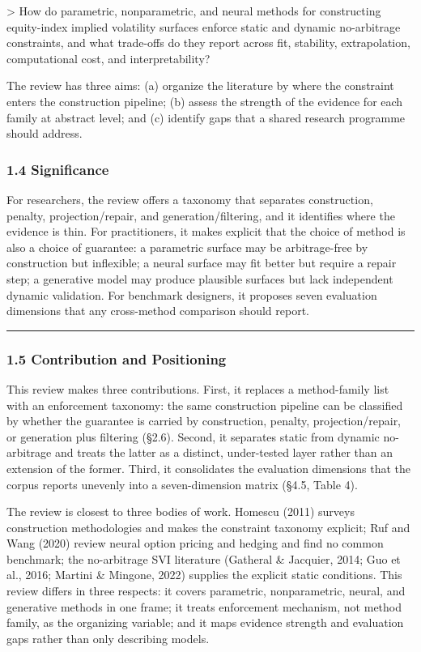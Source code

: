 \documentclass[11pt]{article}
\begin{document}
> How do parametric, nonparametric, and neural methods for constructing equity-index implied volatility surfaces enforce static and dynamic no-arbitrage constraints, and what trade-offs do they report across fit, stability, extrapolation, computational cost, and interpretability?

The review has three aims: (a) organize the literature by where the constraint enters the construction pipeline; (b) assess the strength of the evidence for each family at abstract level; and (c) identify gaps that a shared research programme should address.

\subsubsection*{1.4 Significance}
For researchers, the review offers a taxonomy that separates construction, penalty, projection/repair, and generation/filtering, and it identifies where the evidence is thin. For practitioners, it makes explicit that the choice of method is also a choice of guarantee: a parametric surface may be arbitrage-free by construction but inflexible; a neural surface may fit better but require a repair step; a generative model may produce plausible surfaces but lack independent dynamic validation. For benchmark designers, it proposes seven evaluation dimensions that any cross-method comparison should report.

\par\medskip\hrule\medskip
\subsubsection*{1.5 Contribution and Positioning}
This review makes three contributions. First, it replaces a method-family list with an enforcement taxonomy: the same construction pipeline can be classified by whether the guarantee is carried by construction, penalty, projection/repair, or generation plus filtering (\S 2.6). Second, it separates static from dynamic no-arbitrage and treats the latter as a distinct, under-tested layer rather than an extension of the former. Third, it consolidates the evaluation dimensions that the corpus reports unevenly into a seven-dimension matrix (\S 4.5, Table 4).

The review is closest to three bodies of work. Homescu (2011) surveys construction methodologies and makes the constraint taxonomy explicit; Ruf and Wang (2020) review neural option pricing and hedging and find no common benchmark; the no-arbitrage SVI literature (Gatheral \& Jacquier, 2014; Guo et al., 2016; Martini \& Mingone, 2022) supplies the explicit static conditions. This review differs in three respects: it covers parametric, nonparametric, neural, and generative methods in one frame; it treats enforcement mechanism, not method family, as the organizing variable; and it maps evidence strength and evaluation gaps rather than only describing models.
\end{document}
